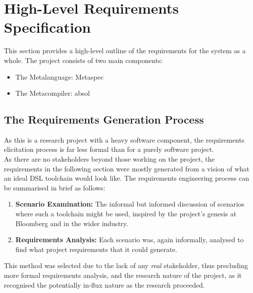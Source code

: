 

\section{High-Level Requirements Specification} %
\label{sec:high_level_requirements_specification}
This section provides a high-level outline of the requirements for the system as a whole.
The project consists of two main components:
\begin{itemize}
    \item The Metalanguage: Metaspec
    \item The Metacompiler: \gls{absol}
\end{itemize}

\subsection{The Requirements Generation Process} %
\label{sub:the_requirements_generation_process}
As this is a research project with a heavy software component, the requirements elicitation process is far less formal than for a purely software project.\\

As there are no stakeholders beyond those working on the project, the requirements in the following section were mostly generated from a vision of what an ideal DSL toolchain would look like. 
The requirements engineering process can be summarised in brief as follows:
\begin{enumerate}
    \item \textbf{Scenario Examination:} The informal but informed discussion of scenarios where such a toolchain might be used, inspired by the project's genesis at Bloomberg and in the wider industry.
    \item \textbf{Requirements Analysis:} Each scenario was, again informally, analysed to find what project requirements that it could generate.
\end{enumerate}

This method was selected due to the lack of any \textit{real} stakeholder, thus precluding more formal requirements analysis, and the research nature of the project, as it recognised the potentially in-flux nature as the research proceeded. 


